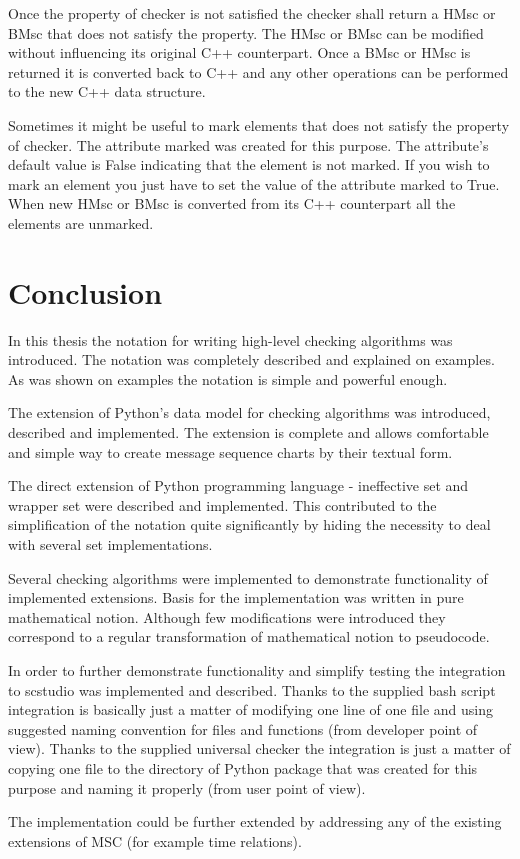 \documentclass[11pt,oneside]{fithesis2}
\begin{document}
Once the property of checker is not satisfied the checker shall return a HMsc or BMsc that does not satisfy the property. The HMsc or BMsc can be modified without influencing its original C++ counterpart. Once a BMsc or HMsc is returned it is converted back to C++ and any other operations can be performed to the new C++ data structure.

Sometimes it might be useful to mark elements that does not satisfy the property of checker. The attribute marked was created for this purpose. The attribute's default value is False indicating that the element is not marked. If you wish to mark an element you just have to set the value of the attribute marked to True. When new HMsc or BMsc is converted from its C++ counterpart all the elements are unmarked.

\chapter{Conclusion}
In this thesis the notation for writing high-level checking algorithms was introduced. The notation was completely described and explained on examples. As was shown on examples the notation is simple and powerful enough.

The extension of Python's data model for checking algorithms was introduced, described and implemented. The extension is complete and allows comfortable and simple way to create message sequence charts by their textual form.

The direct extension of Python programming language - ineffective set and wrapper set were described and implemented. This contributed to the simplification of the notation quite significantly by hiding the necessity to deal with several set implementations.

Several checking algorithms were implemented to demonstrate functionality of implemented extensions. Basis for the implementation was written in pure mathematical notion. Although few modifications were introduced they correspond to a regular transformation of mathematical notion to pseudocode.

In order to further demonstrate functionality and simplify testing the integration to scstudio was implemented and described. Thanks to the supplied bash script integration is basically just a matter of modifying one line of one file and using suggested naming convention for files and functions (from developer point of view). Thanks to the supplied universal checker the integration is just a matter of copying one file to the directory of Python package that was created for this purpose and naming it properly (from user point of view).

The implementation could be further extended by addressing any of the existing extensions of MSC (for example time relations).

\printbibliography
 
\end{document}
